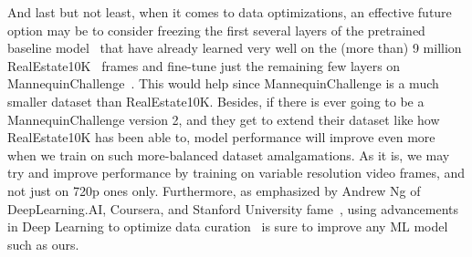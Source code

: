 And last but not least, when it comes to data optimizations, an effective future option may be to consider freezing the first several layers of the pretrained baseline model~\cite{single_view_mpi} that have already learned very well on the (more than) 9 million RealEstate10K~\cite{zhou2018stereo} frames and fine-tune just the remaining few layers on MannequinChallenge~\cite{li2019learning}. This would help since MannequinChallenge is a much smaller dataset than RealEstate10K. Besides, if there is ever going to be a MannequinChallenge version 2, and they get to extend their dataset like how RealEstate10K has been able to, model performance will improve even more when we train on such more-balanced dataset amalgamations. As it is, we may try and improve performance by training on variable resolution video frames, and not just on 720p ones only. Furthermore, as emphasized by Andrew Ng of DeepLearning.AI, Coursera, and Stanford University fame~\cite{bescond_deep-dive_2021}, using advancements in Deep Learning to optimize data curation~\cite{thirumuruganathan_data_2019} is sure to improve any ML model such as ours.